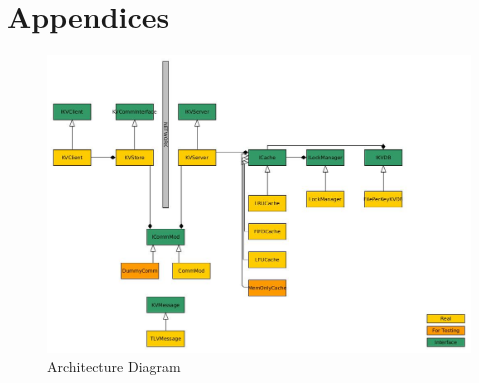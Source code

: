 \documentclass[12pt]{article}
\begin{document}
\newpage

\section{Appendices}

\begin{figure}[H]
\centering
\includegraphics[scale=0.50]{architecture}
\caption{Architecture Diagram}
\label{arch}
\end{figure}
\end{document}
